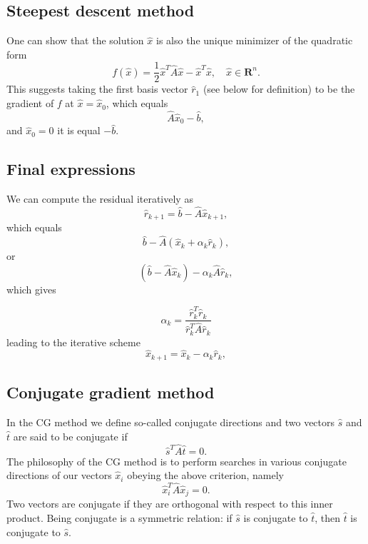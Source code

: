 \documentclass[%
oneside,                 %
final,                   %
10pt]{article}
\begin{document}
\subsection{Steepest descent  method}
\begin{block}{}
One can show that the solution $\hat{x}$ is also the unique minimizer of the quadratic form
\begin{equation*}
  f(\hat{x}) = \frac{1}{2}\hat{x}^T\hat{A}\hat{x} - \hat{x}^T \hat{x} , \quad \hat{x}\in\mathbf{R}^n. 
\end{equation*}
This suggests taking the first basis vector $\hat{r}_1$ (see below for definition) 
to be the gradient of $f$ at $\hat{x}=\hat{x}_0$, 
which equals
\begin{equation*}
\hat{A}\hat{x}_0-\hat{b},
\end{equation*}
and 
$\hat{x}_0=0$ it is equal $-\hat{b}$.

\end{block}

\subsection{Final expressions}
\begin{block}{}
We can compute the residual iteratively as
\begin{equation*}
\hat{r}_{k+1}=\hat{b}-\hat{A}\hat{x}_{k+1},
 \end{equation*}
which equals
\begin{equation*}
\hat{b}-\hat{A}(\hat{x}_k+\alpha_k\hat{r}_k),
 \end{equation*}
or
\begin{equation*}
(\hat{b}-\hat{A}\hat{x}_k)-\alpha_k\hat{A}\hat{r}_k,
 \end{equation*}
which gives

\[
\alpha_k = \frac{\hat{r}_k^T\hat{r}_k}{\hat{r}_k^T\hat{A}\hat{r}_k}
\]
leading to the iterative scheme
\begin{equation*}
\hat{x}_{k+1}=\hat{x}_k-\alpha_k\hat{r}_{k},
 \end{equation*}
\end{block}

\subsection{Conjugate gradient method}
\begin{block}{}
In the CG method we define so-called conjugate directions and two vectors 
$\hat{s}$ and $\hat{t}$
are said to be
conjugate if
\begin{equation*}
\hat{s}^T\hat{A}\hat{t}= 0.
\end{equation*}
The philosophy of the CG method is to perform searches in various conjugate directions
of our vectors $\hat{x}_i$ obeying the above criterion, namely
\begin{equation*}
\hat{x}_i^T\hat{A}\hat{x}_j= 0.
\end{equation*}
Two vectors are conjugate if they are orthogonal with respect to 
this inner product. Being conjugate is a symmetric relation: if $\hat{s}$ is conjugate to $\hat{t}$, then $\hat{t}$ is conjugate to $\hat{s}$.
\end{block}
\end{document}
